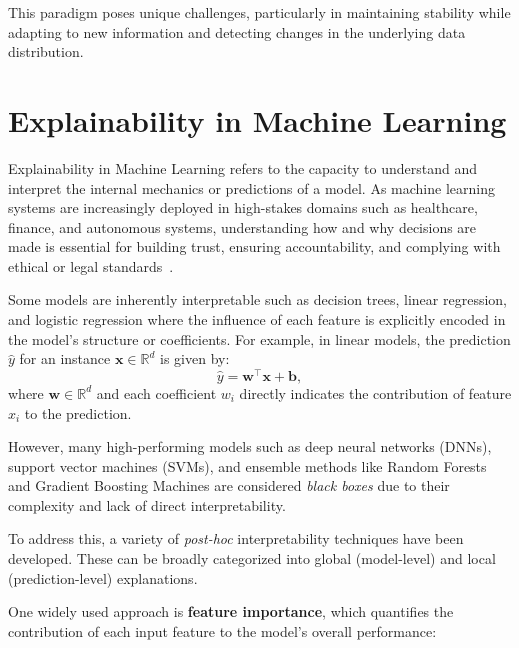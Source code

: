 This paradigm poses unique challenges, particularly in maintaining stability
while adapting to new information and detecting changes in the underlying data
distribution.

\section{Explainability in Machine Learning}\label{sec:explainability}

Explainability in Machine Learning refers to the capacity to understand and
interpret the internal mechanics or predictions of a model. As machine learning
systems are increasingly deployed in high-stakes domains such as healthcare,
finance, and autonomous systems, understanding how and why decisions are made
is essential for building trust, ensuring accountability, and complying with
ethical or legal standards~\cite{importance_of_explainabilty}.

Some models are inherently interpretable such as decision trees, linear
regression, and logistic regression where the influence of each feature is
explicitly encoded in the model's structure or coefficients. For example, in
linear models, the prediction $\hat{y}$ for an instance $\mathbf{x} \in
    \mathbb{R}^d$ is given by:
\begin{equation}
    \hat{y} = \mathbf{w}^\top \mathbf{x} + \mathbf{b},
\end{equation}
where $\mathbf{w} \in \mathbb{R}^d$ and each coefficient $w_i$ directly indicates the contribution of feature
$x_i$ to the prediction.

However, many high-performing models such as deep neural networks (DNNs),
support vector machines (SVMs), and ensemble methods like Random Forests and
Gradient Boosting Machines are considered \emph{black boxes} due to their
complexity and lack of direct interpretability.

To address this, a variety of \emph{post-hoc} interpretability techniques have
been developed. These can be broadly categorized into global (model-level) and
local (prediction-level) explanations.

One widely used approach is \textbf{feature importance}, which quantifies the
contribution of each input feature to the model's overall performance:


